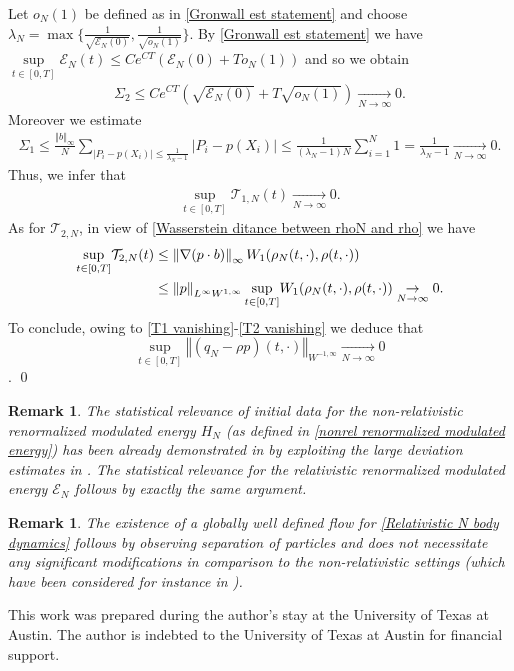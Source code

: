 \documentclass[11pt,reqno]{amsart}
\newtheorem{rem}[thm]{Remark}
\numberwithin{equation}{section}
\begin{document}
Let $o_{N}(1)$ be defined as in \eqref{Gronwall est statement} and choose $\lambda_{N}=\max\{\frac{1}{\sqrt{\mathcal{E}_{N}(0)}},\frac{1}{\sqrt{o_{N}(1)}}\}$. By \eqref{Gronwall est statement} we have $\underset{t\in [0,T]}{\sup}\mathcal{E}_{N}(t)\leq Ce^{CT}(\mathcal{E}_{N}(0)+To_{N}(1))$ and so we obtain
\begin{align*}
\Sigma_{2}\leq Ce^{CT}\left(\sqrt{\mathcal{E}_{N}(0)}+T\sqrt{o_{N}(1)}\right)\underset{N\rightarrow \infty}{\rightarrow}0.    
\end{align*}
Moreover we estimate 
\begin{align*}
\Sigma_{1}\leq \frac{\left\Vert b\right\Vert_{\infty}}{N}\sum_{\left\vert P_{i}-p(X_{i})\right\vert\leq \frac{1}{\lambda_{N}-1}}\left\vert P_{i}-p(X_{i})\right\vert\leq \frac{1}{(\lambda_{N}-1)N}\sum_{i=1}^{N}1=\frac{1}{\lambda_{N} -1}\underset{N\rightarrow \infty}{\rightarrow}0.      
\end{align*}
Thus, we infer that  
\begin{align}
\underset{t\in [0,T]}{\sup}\mathcal{T}_{1,N}(t)\underset{N\rightarrow \infty}{\rightarrow} 0. \label{T1 vanishing} \end{align}
As for $\mathcal{T}_{2,N}$, in view of \eqref{Wasserstein ditance between rhoN and rho} we have 
\begin{align}
\underset{t\in [0,T]}{\sup}\mathcal{T}_{2,N}(t)&\leq \left\Vert \nabla (p\cdot b)\right\Vert_{\infty}W_{1}(\rho_{N}(t,\cdot),\rho(t,\cdot)) \notag\\
&\leq \left\Vert p\right\Vert_{L^{\infty}W^{1,\infty}}\underset{t\in [0,T]}{\sup}W_{1}(\rho_{N}(t,\cdot),\rho(t,\cdot))\underset{N\rightarrow \infty}{\rightarrow} 0. \label{T2 vanishing}
\end{align}
To conclude, owing to \eqref{T1 vanishing}-\eqref{T2 vanishing} we deduce that  $$\underset{t\in [0,T]}{\sup}\left\Vert (q_{N}-\rho p)(t,\cdot)\right\Vert_{W^{-1,\infty}}\underset{N\rightarrow \infty}{\rightarrow} 0$$. 
\qed
\begin{rem}
The statistical relevance of initial data for the non-relativistic renormalized modulated energy $H_{N}$ 
(as defined in \eqref{nonrel renormalized modulated energy}) has been already demonstrated in \cite{han2021newton} by exploiting the large deviation estimates in \cite{fournier2015rate}. The statistical relevance for the relativistic renormalized modulated energy $\mathcal{E}_{N}$ follows by exactly the same argument.
\end{rem}
\begin{rem}
The existence of a globally well defined flow for \eqref{Relativistic N body dynamics} follows by observing separation of particles and does not necessitate any significant modifications in comparison to the non-relativistic settings (which have been considered for instance in \cite{porat2026supercritical}).       
\end{rem}
This work was prepared during the author's stay at the University of Texas at Austin. The author is indebted to the University of Texas at Austin for financial support.
\end{document}

